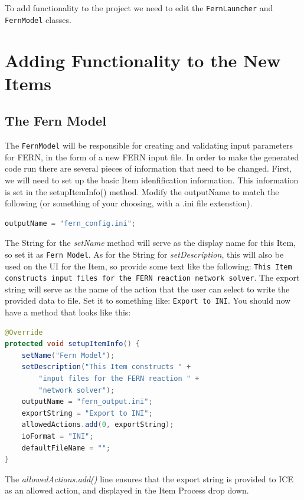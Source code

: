To add functionality to the project we need to edit
the \texttt{FernLauncher} and \texttt{FernModel} classes.

\section{Adding Functionality to the New Items}

\subsection{The Fern Model}

The \texttt{FernModel} will be responsible for creating and
validating input parameters for FERN, in the form of a new FERN input file.  In
order to make the generated code run there are several pieces of information that need to be changed.  First, we
will need to set up the basic Item idenfification information. This information
is set in the setupItemInfo() method. Modify the outputName to match the
following (or something of your choosing, with a .ini file extenstion).

\begin{lstlisting}[language=Java]
outputName = "fern_config.ini";
\end{lstlisting}

The String for the \emph{setName} method will serve as the display name
for this Item, so set it as \texttt{Fern Model}.
As for the String for \emph{setDescription}, this will also be used on the UI
for the Item, so provide some text like the following: \texttt{This Item constructs input files
for the FERN reaction network solver}. The export string will serve as the name
of the action that the user can select to write the provided data to file. Set
it to something like: \texttt{Export to INI}. You should now have a method that
looks like this:

\begin{lstlisting}[language=Java]
@Override
protected void setupItemInfo() {
	setName("Fern Model");
	setDescription("This Item constructs " +
	    "input files for the FERN reaction " +
	    "network solver"); 
	outputName = "fern_output.ini";   
	exportString = "Export to INI";
	allowedActions.add(0, exportString);
	ioFormat = "INI";
	defaultFileName = "";
}
\end{lstlisting}

The \emph{allowedActions.add()} line ensures that the export string is provided
to ICE as an allowed action, and displayed in the Item Process drop down.

